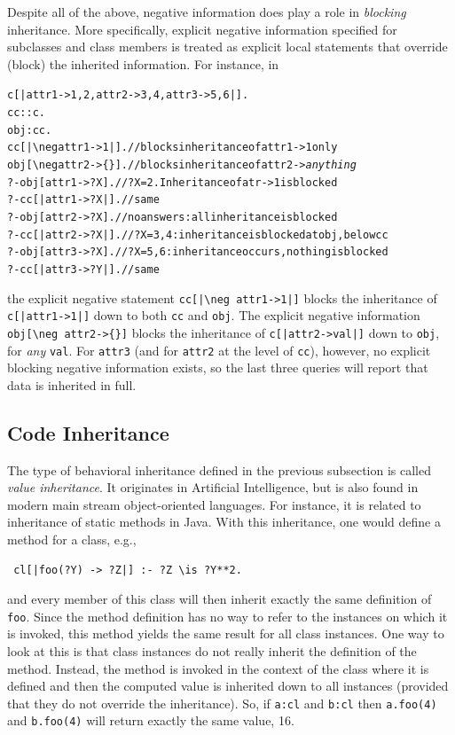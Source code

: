 \documentclass[11pt]{article}
\newcommand{\bs}{\textbackslash}
\newcommand{\RULELOGNEG}{{\texttt{{\bs}neg}}\xspace}
\begin{document}
Despite all of the above, negative information does play a role in
\emph{blocking} inheritance. More specifically, explicit negative
information specified for subclasses and class members is treated as
explicit local statements that override (block) the inherited information. For
instance, in
\begin{alltt}
    c[|attr1->{1,2}, attr2->{3,4}, attr3->{5,6}|].
    cc::c.
    obj:cc.
    cc[|\bs{}neg attr1->1|].   // blocks inheritance of attr1->1 only
    obj[\bs{}neg attr2->\{\}].   // blocks inheritance of attr2->\textnormal{\emph{anything}}
    ?- obj[attr1->?X].     // ?X = 2. Inheritance of atr->1 is blocked
    ?- cc[|attr1->?X|].    // same
    ?- obj[attr2->?X].     // no answers: all inheritance is blocked
    ?- cc[|attr2->?X|].    // ?X = 3,4: inheritance is blocked at obj, below cc
    ?- obj[attr3->?X].     // ?X = 5,6: inheritance occurs, nothing is blocked
    ?- cc[|attr3->?Y|].    // same
\end{alltt}
the explicit negative statement \texttt{cc[|\RULELOGNEG attr1->1|]} blocks the
inheritance of \texttt{c[|attr1->1|]} down to both \texttt{cc} and \texttt{obj}.
The explicit negative information \verb|obj[\neg attr2->{}]|
blocks the inheritance of \texttt{c[|attr2->val|]} down to \texttt{obj},
for \emph{any} \texttt{val}.  
For \texttt{attr3} (and for \texttt{attr2} at the level of \texttt{cc}),
however, no explicit blocking negative information
exists, so the last three queries will report that data is inherited in
full.

\subsection{Code Inheritance}

The type of behavioral inheritance defined in the previous subsection is
called \emph{value inheritance}.  It originates in Artificial Intelligence,
but is also found in modern main stream object-oriented languages.
For instance, it is related to inheritance of static methods in Java.
With this inheritance, one would define a method for a class, e.g., 
\begin{verbatim}
 cl[|foo(?Y) -> ?Z|] :- ?Z \is ?Y**2.
\end{verbatim}
and every member of this class will then inherit exactly the same definition of
{\tt foo}.
Since the method definition
has no way to refer to the instances on which it is invoked,
this method yields the same result for all class instances.
One way to look at this is
that class instances do not really inherit the definition of the method.
Instead, the method is invoked in the context of the class where it is
defined and then the computed value is inherited down to all instances
(provided that they do not override the inheritance).  So, if {\tt a:cl}
and {\tt b:cl} then {\tt a.foo(4)} and {\tt b.foo(4)} will return exactly
the same value, 16.
\end{document}
